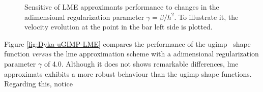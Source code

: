\documentclass[preprint,12pt,a4paper]{elsarticle}
\begin{document}
\begin{figure}\sidecaption
  \centering
  \caption{Sensitive of LME approximants performance to changes in the
    adimensional regularization parameter $\gamma = \beta/h^2$. To
    illustrate it, the velocity evolution at the point in the bar left side
    is plotted.}
  \label{fig:Dyka-LME-gamma}
\end{figure}
Figure \ref{fig:Dyka-uGIMP-LME} compares the performance of the
\acrshort{ugimp}~\cite{Bardenhagen2004} shape function \textit{versus} the \acrshort{lme} approximation scheme with
a adimensional regularization parameter $\gamma$ of 4.0. Although it
does not shows remarkable differences, \acrshort{lme} approximats exhibits a more
robust behaviour than the \acrshort{ugimp} shape functions. Regarding this, notice
\end{document}
